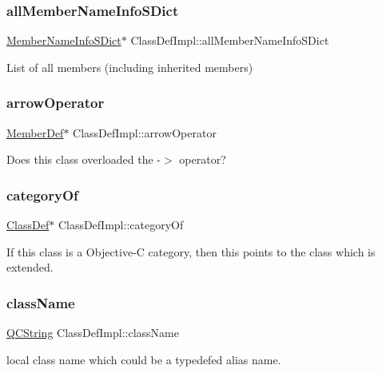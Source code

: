 \subsubsection{\texorpdfstring{allMemberNameInfoSDict}{allMemberNameInfoSDict}}
{\footnotesize\ttfamily \mbox{\hyperlink{class_member_name_info_s_dict}{Member\+Name\+Info\+S\+Dict}}$\ast$ Class\+Def\+Impl\+::all\+Member\+Name\+Info\+S\+Dict}

List of all members (including inherited members) \mbox{\label{class_class_def_impl_a94bc1b4ff18537f707b575ce6e60920c}} 
\subsubsection{\texorpdfstring{arrowOperator}{arrowOperator}}
{\footnotesize\ttfamily \mbox{\hyperlink{class_member_def}{Member\+Def}}$\ast$ Class\+Def\+Impl\+::arrow\+Operator}

Does this class overloaded the -\/$>$ operator? \mbox{\label{class_class_def_impl_aa33f23ac88249219ec76053a54684ae8}} 
\subsubsection{\texorpdfstring{categoryOf}{categoryOf}}
{\footnotesize\ttfamily \mbox{\hyperlink{class_class_def}{Class\+Def}}$\ast$ Class\+Def\+Impl\+::category\+Of}

If this class is a Objective-\/C category, then this points to the class which is extended. \mbox{\label{class_class_def_impl_a5eecc11f35a74b7ac718fc46b9d8de26}} 
\subsubsection{\texorpdfstring{className}{className}}
{\footnotesize\ttfamily \mbox{\hyperlink{class_q_c_string}{Q\+C\+String}} Class\+Def\+Impl\+::class\+Name}

local class name which could be a typedef\textquotesingle{}ed alias name. \mbox{\label{class_class_def_impl_a06cff6a1a96e99c26cd50bf1250bbf36}} 
